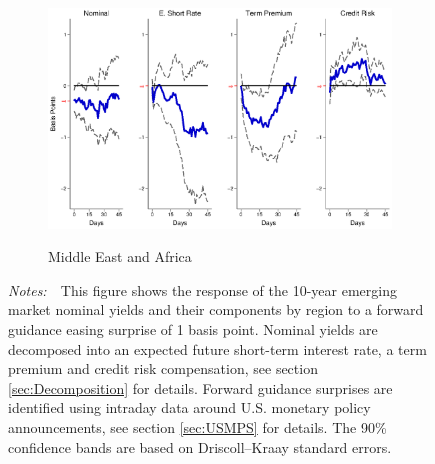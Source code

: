 \documentclass[a4paper, 12pt]{article}
\newcommand{\figtext}[1]{
	\vspace{-1ex}
	\captionsetup{justification=justified,font=footnotesize}
	\caption*{#1}
}
\newcommand{\fignotes}[1]{\figtext{\emph{Notes:~}~#1}}
\begin{document}
\begin{appendices}
\begin{landscape}
\begin{figure}[tbph]
\begin{center}
\begin{minipage}{\linewidth}
\begin{center}
						\begin{subfigure}[t]{\linewidth}
							\includegraphics[trim={0cm 0cm 0cm 0cm},clip,height=0.35\textheight,width=\linewidth]{../Figures/PathMAnomyptpphi120m.eps} \\
							\vspace{-0.35cm}
							\caption{Middle East and Africa} \label{subfig:LPMA10Ypath}
						\end{subfigure}
						\vspace{-0.45cm}
					\end{center}
					\fignotes{This figure shows the response of the 10-year emerging market nominal yields and their components by region to a forward guidance easing surprise of 1 basis point. Nominal yields are decomposed into an expected future short-term interest rate, a term premium and credit risk compensation, see section \ref{sec:Decomposition} for details. Forward guidance surprises are identified using intraday data around U.S. monetary policy announcements, see section \ref{sec:USMPS} for details. The 90\% confidence bands are based on Driscoll--Kraay standard errors.}
				\end{minipage}
			\end{center}
		\end{figure}
		
		\pagebreak[4]
		

\end{landscape}
\end{appendices}
\end{document}
